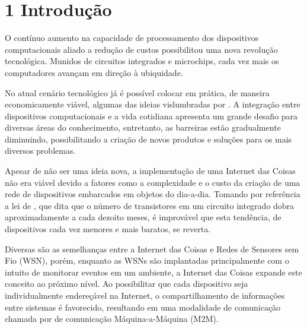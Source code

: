 \documentclass[twoside,english,brazilian]{UNISINOSmonografia}
\begin{document}
\chapter{1 Introdução}

{}

	O contínuo aumento na capacidade de processamento dos dispositivos 
	computacionais aliado a redução de custos possibilitou uma nova revolução 
	tecnológica. Munidos de circuitos integrados e microchips, cada vez mais 
	os computadores avançam em direção à ubiquidade. 
	
	No atual cenário tecnológico já é possível colocar em prática, de maneira 
	economicamente viável, algumas das ideias vislumbradas por 
	. A integração entre dispositivos computacionais e a 
	vida cotidiana apresenta um grande desafio para diversas áreas do 
	conhecimento, entretanto, as barreiras estão gradualmente diminuindo,
	possibilitando a criação de novos produtos e soluções para os mais 
	diversos problemas. 
	
	Apesar de não ser uma ideia nova, a implementação de uma Internet das 
	Coisas não era viável devido a fatores como a complexidade e o custo da 
	criação de uma rede de dispositivos embarcados em objetos do dia-a-dia. 
	Tomando por referência a lei de , que dita que o 
	número de transistores em um circuito integrado dobra aproximadamente a 
	cada dezoito meses, é improvável que esta tendência, de dispositivos cada 
	vez menores e mais baratos, se reverta.
	
	Diversas são as semelhanças entre a Internet das Coisas e Redes de 
	Sensores sem Fio (WSN), porém, enquanto as WSNs \cite{Sakthidharan2012} 
	são implantadas principalmente com o intuito de monitorar eventos em um 
	ambiente, a Internet das Coisas expande este conceito ao próximo nível. Ao 
	possibilitar que cada dispositivo seja individualmente endereçável na 
	Internet, o compartilhamento de informações entre sistemas é favorecido, 
	resultando em uma modalidade de comunicação chamada por 
	 de comunicação Máquina-a-Máquina (M2M).
\end{document}
